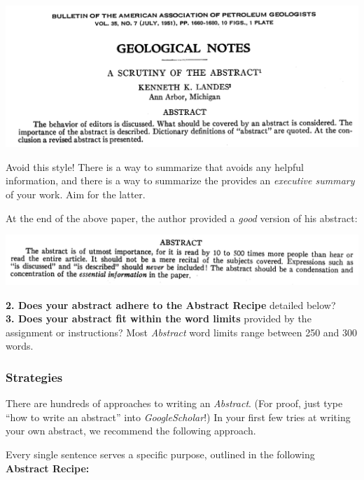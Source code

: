 \documentclass[
]{book}
\begin{document}
\includegraphics{img/abstracts-bad.png}

Avoid this style! There is a way to summarize that avoids any helpful information, and there is a way to summarize the provides an \emph{executive summary} of your work. Aim for the latter.

At the end of the above paper, the author provided a \emph{good} version of his abstract:

\includegraphics{img/abstracts-good.png}

\textbf{2. Does your abstract adhere to the Abstract Recipe} detailed below?\\
\textbf{3. Does your abstract fit within the word limits} provided by the assignment or instructions? Most \emph{Abstract} word limits range between 250 and 300 words.

\hypertarget{strategies}{%
\subsubsection*{Strategies}\label{strategies}}

There are hundreds of approaches to writing an \emph{Abstract}. (For proof, just type ``how to write an abstract'' into \emph{GoogleScholar}!) In your first few tries at writing your own abstract, we recommend the following approach.

Every single sentence serves a specific purpose, outlined in the following \textbf{Abstract Recipe:}
\end{document}
